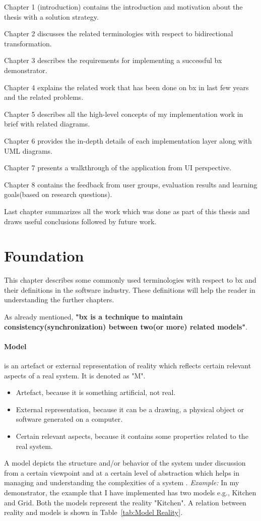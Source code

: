 Chapter 1 (introduction) contains the introduction and motivation about the thesis with a solution strategy.

Chapter 2 discusses the related terminologies with respect to bidirectional transformation.

Chapter 3 describes the requirements for implementing a successful bx demonstrator.

Chapter 4 explains the related work that has been done on bx in last few years and the related problems.

Chapter 5 describes all the high-level concepts of my implementation work in brief with related diagrams.

Chapter 6 provides the in-depth details of each implementation layer along with UML diagrams.

Chapter 7 presents a walkthrough of the application from UI perspective.

Chapter 8 contains the feedback from user groups, evaluation results and learning goals(based on research questions).

Last chapter summarizes all the work which was done as part of this thesis and draws useful conclusions followed by future work.

\section{Foundation}\label{sec:foundation}
This chapter describes some commonly used terminologies with respect to bx and their definitions in the software industry. These definitions will help the reader in understanding the further chapters.

As already mentioned, \textbf{"bx is a technique to maintain consistency(synchronization) between two(or more) related models"}.

\paragraph{Model}is an artefact or external representation of reality which reflects certain relevant aspects of a real system. It is denoted as "M".
\begin{itemize}
\item {Artefact, because it is something artificial, not real.}
\item {External representation, because it can be a drawing, a physical object or software generated on a computer.}
\item {Certain relevant aspects, because it contains some properties related to the real system.}
\end{itemize}
A model depicts the structure and/or behavior of the system under discussion from a certain viewpoint and at a certain level of abstraction which helps in managing and understanding the complexities of a system \cite{uml} \cite{mdsd}.
\newline\newline\textit{Example:} In my demonstrator, the example that I have implemented has two models e.g., Kitchen and Grid. Both the models represent the reality "Kitchen". A relation between reality and models is shown in Table~\ref{tab:Model Reality}.

